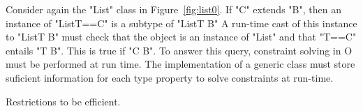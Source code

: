 Consider again the \xcd"List" class in Figure~\ref{fig:list0}.
If \xcd"C" extends \xcd"B", then an instance of
\xcd"List{T==C}" is a subtype of 
\xcd"List{T \extends B}"
A run-time cast of this instance to
\xcd"List{T \extends B}"
must check
that the object is an instance of \xcd"List"
and that \xcd"T==C" entails \xcd"T \extends B".
This is true if \xcd"C \extends B".
To answer this query,
constraint solving in {\cal O} must be performed at 
run time.
The implementation of a generic class must store suficient
information for each type property to solve constraints at
run-time.

Restrictions to be efficient.
